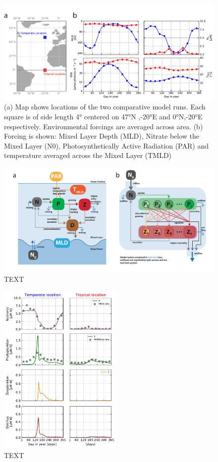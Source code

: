 \documentclass[journal abbreviation, manuscript]{copernicus}
\begin{document}
\clearpage

\begin{figure}[t]
\includegraphics[width=15cm]{Figures/firstdraft_plots/01_forcing_labeled.pdf}
\caption{(a) Map shows locations of the two comparative model runs. Each square is of side length 4° centered on 47°N ,-20°E and 0°N,-20°E respectively. Environmental forcings are averaged across area. (b) Forcing is shown: Mixed Layer Depth (MLD), Nitrate below the Mixed Layer (N0),
Photosynthetically Active Radiation (PAR) and temperature averaged across the Mixed Layer (TMLD)}
\label{phydraforcing}
\end{figure}



\begin{figure}[t]
\includegraphics[width=15cm]{Figures/firstdraft_schematics/02__schematics_NPZDandChemostat.pdf}
\caption{TEXT}
\label{phydraschematics_1}
\end{figure}


\begin{figure}[t]
\includegraphics[width=6cm]{Figures/firstdraft_plots/02_NPZDslab.pdf}
\caption{TEXT}
\end{figure}
\end{document}
